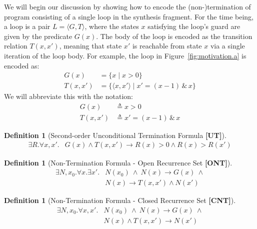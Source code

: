 \documentclass[preprint]{sigplanconf}
\theoremstyle{definition}
\newtheorem{definition}[theorem]{Definition}
\begin{document}
We will begin our discussion by showing how to encode the (non-)termination of program consisting of a single loop 
in the synthesis fragment.  For the time being, a loop is a pair ${L= \langle G,T \rangle}$,
where the states $x$ satisfying the loop's guard are given by the predicate $G(x)$.
The body of the loop is encoded as the transition relation $T(x, x')$, meaning that
state $x'$ is reachable from state $x$ via a single iteration of the loop body.
For example, the loop in Figure~\ref{fig:motivation.a} is encoded as:
\begin{align*}
G(x) & = \{ x \mid x>0 \} \\
T(x,x') &= \{ \langle x, x' \rangle \mid x' = (x - 1) \, \& \, x \}
\end{align*}
We will abbreviate this with the notation:
\begin{align*}
G(x) & \triangleq x > 0 \\
T(x, x') & \triangleq x' = (x - 1) \, \& \, x
\end{align*}

\begin{figure*}
\begin{framed}
\begin{definition}[Second-order Unconditional Termination Formula {\bf [UT]}]
\label{def:UT}
\begin{align*}
 \exists R . \forall x, x' . & G(x) \wedge T(x, x') \rightarrow R(x) > 0 \wedge R(x) > R(x')
\end{align*}
\end{definition}

\begin{definition}[Non-Termination Formula - Open Recurrence Set  {\bf [ONT]}]
\label{def:ont}
 \begin{align*}
  \exists N, x_0 . \forall x . \exists x' . & N(x_0) ~ \wedge ~ N(x) \rightarrow G(x) ~ \wedge \\
							& N(x) \rightarrow T(x, x') \wedge N(x') 
 \end{align*}
\end{definition}

\begin{definition}[Non-Termination Formula - Closed Recurrence Set {\bf [CNT]}]
\label{def:cnt}
 \begin{align*}
  \exists N, x_0 . \forall x, x' . & N(x_0) ~ \wedge ~ N(x) \rightarrow G(x) ~ \wedge \\
							& N(x) \wedge T(x, x') \rightarrow N(x') 
 \end{align*}
\end{definition}

\end{framed}
\end{figure*}
\end{document}
